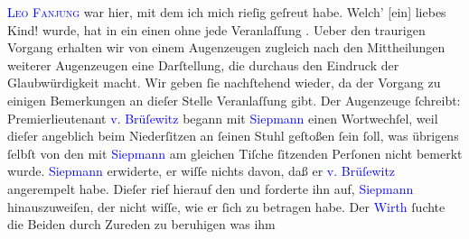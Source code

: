            \noindent{}\textsc{\textcolor{blue}{Leo Fanjung}{}\ledrightnote{\textcolor{blue}{Leo Van-Jung}}} war hier, mit dem ich mich rieſig geſreut habe. Welch’
                     {[}ein{]} liebes Kind!\pend
           {\bigskip}\pstart
           \noindent{}{\pb}\label{K_L02787-999v}\label{K_L02787-999h} wurde, hat in \textcolor{pink}{}{}\ledrightnote{\textcolor{pink}{Karlsruhe}} ein \textcolor{blue}{}{} einen \textcolor{blue}{}{} ohne jede Veranlaſſung . Ueber den
               traurigen Vorgang erhalten wir von einem Augenzeugen zugleich nach den Mittheilungen
               weiterer Augenzeugen eine Darſtellung, die durchaus den Eindruck der Glaubwürdigkeit
               macht. Wir geben ſie nachſtehend wieder, da der Vorgang zu einigen Bemerkungen an
               dieſer Stelle Veranlaſſung gibt. Der Augenzeuge ſchreibt:\pend
           \pstart
           Premierlieutenant \textcolor{blue}{v. Brüſewitz}{}\ledrightnote{\textcolor{blue}{Henning von Brüsewitz}} begann mit \textcolor{blue}{Siepmann}{}\ledrightnote{\textcolor{blue}{Theodor Siepmann}} einen Wortwechſel, weil dieſer
               angeblich beim Niederſitzen an ſeinen Stuhl geſtoßen ſein ſoll, was übrigens ſelbſt
               von den mit \textcolor{blue}{Siepmann}{}\ledrightnote{\textcolor{blue}{Theodor Siepmann}} am gleichen Tiſche
               ſitzenden Perſonen nicht bemerkt wurde. \textcolor{blue}{Siepmann}{}\ledrightnote{\textcolor{blue}{Theodor Siepmann}} erwiderte, er wiſſe nichts davon, daß er \textcolor{blue}{v. Brüſewitz}{}\ledrightnote{\textcolor{blue}{Henning von Brüsewitz}} angerempelt habe. Dieſer rief hierauf den
                  \label{K_L02787-19v}\label{K_L02787-19h} und forderte
               ihn auf, \textcolor{blue}{Siepmann}{}\ledrightnote{\textcolor{blue}{Theodor Siepmann}} hinauszuweiſen, der nicht
               wiſſe, wie er ſich zu betragen habe. Der \textcolor{blue}{Wirth}{} ſuchte die Beiden durch Zureden zu beruhigen was ihm
